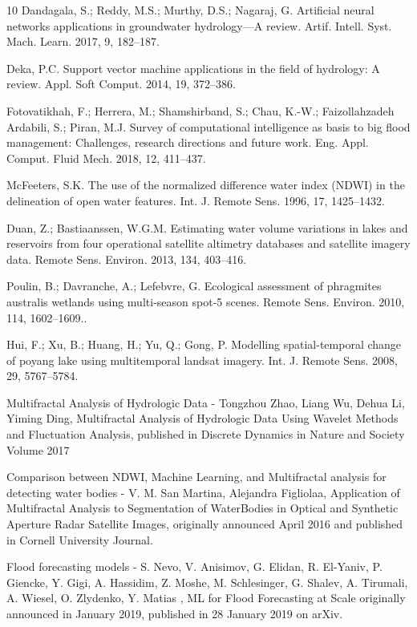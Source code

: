 \documentclass[12pt, a4paper]{report}
\begin{document}
\begin{thebibliography} {10}
Dandagala, S.; Reddy, M.S.; Murthy, D.S.; Nagaraj, G. Artificial neural networks applications in groundwater hydrology—A review. Artif. Intell. Syst. Mach. Learn. 2017, 9, 182–187.

Deka, P.C. Support vector machine applications in the field of hydrology: A review. Appl. Soft Comput. 2014,
19, 372–386.

Fotovatikhah, F.; Herrera, M.; Shamshirband, S.; Chau, K.-W.; Faizollahzadeh Ardabili, S.; Piran, M.J. Survey of computational intelligence as basis to big flood management: Challenges, research directions and future work. Eng. Appl. Comput. Fluid Mech. 2018, 12, 411–437. 

McFeeters, S.K. The use of the normalized difference water index (NDWI) in the delineation of open water features. Int. J. Remote Sens. 1996, 17, 1425–1432.

Duan, Z.; Bastiaanssen, W.G.M. Estimating water volume variations in lakes and reservoirs from four operational satellite altimetry databases and satellite imagery data. Remote Sens. Environ. 2013, 134, 403–416.

Poulin, B.; Davranche, A.; Lefebvre, G. Ecological assessment of phragmites australis wetlands using multi-season spot-5 scenes. Remote Sens. Environ. 2010, 114, 1602–1609..

Hui, F.; Xu, B.; Huang, H.; Yu, Q.; Gong, P. Modelling spatial-temporal change of poyang lake using multitemporal landsat imagery. Int. J. Remote Sens. 2008, 29, 5767–5784.

Multifractal Analysis of Hydrologic Data -
Tongzhou Zhao, Liang Wu, Dehua Li, Yiming Ding, Multifractal Analysis of Hydrologic Data Using Wavelet Methods and Fluctuation Analysis, published in Discrete Dynamics in Nature and Society
Volume 2017

Comparison between NDWI, Machine Learning, and Multifractal analysis for detecting water bodies -  
V. M. San Martina, Alejandra Figliolaa, Application of Multifractal Analysis to Segmentation of WaterBodies in Optical and Synthetic Aperture Radar Satellite Images, originally announced April 2016 and published in Cornell University Journal.

Flood forecasting models - S. Nevo, V. Anisimov, G. Elidan, R. El-Yaniv, P. Giencke, Y. Gigi, A. Hassidim, Z. Moshe, M. Schlesinger, G. Shalev, A. Tirumali, A. Wiesel, O. Zlydenko, Y. Matias ,  ML for Flood Forecasting at Scale originally announced in January 2019, published in 28 January 2019 on arXiv.


\end{thebibliography}
\end{document}
